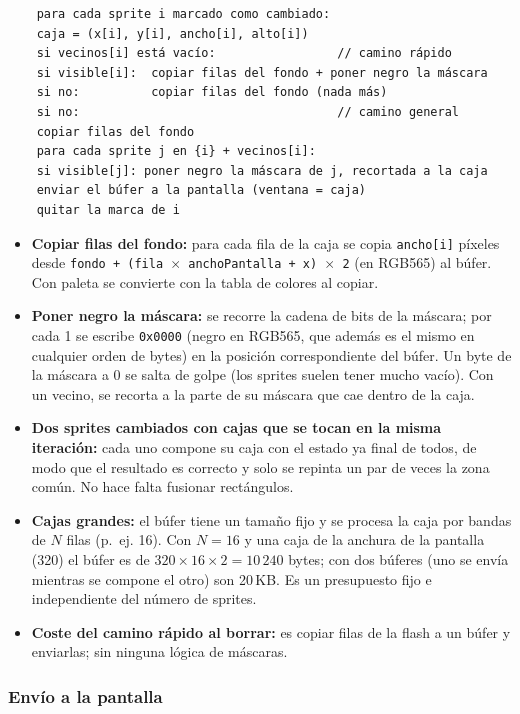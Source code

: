 \begin{verbatim}
	para cada sprite i marcado como cambiado:
	caja = (x[i], y[i], ancho[i], alto[i])
	si vecinos[i] está vacío:                 // camino rápido
	si visible[i]:  copiar filas del fondo + poner negro la máscara
	si no:          copiar filas del fondo (nada más)
	si no:                                    // camino general
	copiar filas del fondo
	para cada sprite j en {i} + vecinos[i]:
	si visible[j]: poner negro la máscara de j, recortada a la caja
	enviar el búfer a la pantalla (ventana = caja)
	quitar la marca de i
\end{verbatim}

\begin{itemize}
	\item \textbf{Copiar filas del fondo:} para cada fila de la caja se copia \texttt{ancho[i]} píxeles desde \texttt{fondo + (fila\,$\times$\,anchoPantalla + x)\,$\times$\,2} (en RGB565) al búfer. Con paleta se convierte con la tabla de colores al copiar.
	\item \textbf{Poner negro la máscara:} se recorre la cadena de bits de la máscara; por cada 1 se escribe \texttt{0x0000} (negro en RGB565, que además es el mismo en cualquier orden de bytes) en la posición correspondiente del búfer. Un byte de la máscara a 0 se salta de golpe (los sprites suelen tener mucho vacío). Con un vecino, se recorta a la parte de su máscara que cae dentro de la caja.
	\item \textbf{Dos sprites cambiados con cajas que se tocan en la misma iteración:} cada uno compone su caja con el estado ya final de todos, de modo que el resultado es correcto y solo se repinta un par de veces la zona común. No hace falta fusionar rectángulos.
	\item \textbf{Cajas grandes:} el búfer tiene un tamaño fijo y se procesa la caja por bandas de $N$ filas (p.~ej. 16). Con $N=16$ y una caja de la anchura de la pantalla (320) el búfer es de $320\times16\times2=10\,240$ bytes; con dos búferes (uno se envía mientras se compone el otro) son 20\,KB. Es un presupuesto fijo e independiente del número de sprites.
	\item \textbf{Coste del camino rápido al borrar:} es copiar filas de la flash a un búfer y enviarlas; sin ninguna lógica de máscaras.
\end{itemize}

\subsubsection{Envío a la pantalla}

